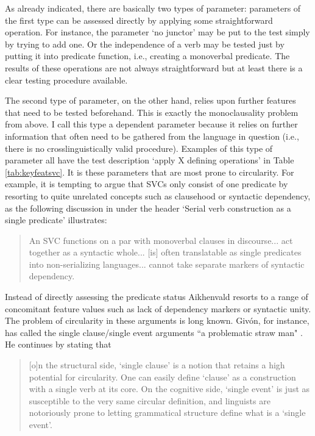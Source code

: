 As already indicated, there are basically two types of parameter: parameters of the first type can be assessed directly by applying some straightforward operation. For instance, the parameter `no junctor' may be put to the test simply by trying to add one. Or the independence of a verb may be tested just by putting it into predicate function, i.e., creating a monoverbal predicate. The results of these operations are not always straightforward but at least there is a clear testing procedure available. 

The second type of parameter, on the other hand, relies upon further features that need to be tested beforehand. This is exactly the monoclausality problem from above. I call this type a dependent parameter because it relies on further information that often need to be gathered from the language in question (i.e., there is no crosslinguistically valid procedure). Examples of this type of parameter all have the test description `apply X defining operations' in Table \ref{tab:keyfeatsvc}. It is these parameters that are most prone to circularity. For example, it is tempting to argue that SVCs only consist of one predicate by resorting to quite unrelated concepts such as clausehood or syntactic dependency, as the following discussion in \citet[4]{Aikhenvald2006} under the header `Serial verb construction as a single predicate' illustrates:
\begin{quote}An SVC functions on a par with monoverbal clauses in discourse... act together as a syntactic whole... [is] often translatable as single predicates into non-serializing languages... cannot take separate markers of syntactic dependency.\end{quote} 

Instead of directly assessing the predicate status Aikhenvald resorts to a range of concomitant feature values such as lack of dependency markers or syntactic unity. The problem of circularity in these arguments is long known. Givón, for instance, has called the single clause/single event arguments ``a problematic straw man" \citep[84]{givon1991serial}. He continues by stating that
\begin{quote}[o]n the structural side, `single clause' is a notion that retains a high potential for circularity. One can
easily define `clause' as a construction with a single verb at its core. On the cognitive side, `single event' is just as susceptible to the very same circular definition, and linguists are notoriously prone to letting grammatical structure define what is a `single event'.\end{quote}


